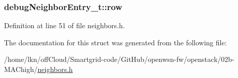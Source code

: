 \subsubsection[{\texorpdfstring{row}{row}}]{ debug\+Neighbor\+Entry\+\_\+t\+::row}\hypertarget{structdebug_neighbor_entry__t_ab393c4e54604336bb6f9d4da65aabf62}{}\label{structdebug_neighbor_entry__t_ab393c4e54604336bb6f9d4da65aabf62}


Definition at line 51 of file neighbors.\+h.



The documentation for this struct was generated from the following file\+:\begin{DoxyCompactItemize}
\item 
/home/lkn/off\+Cloud/\+Smartgrid-\/code/\+Git\+Hub/openwsn-\/fw/openstack/02b-\/\+M\+A\+Chigh/\hyperlink{neighbors_8h}{neighbors.\+h}\end{DoxyCompactItemize}
